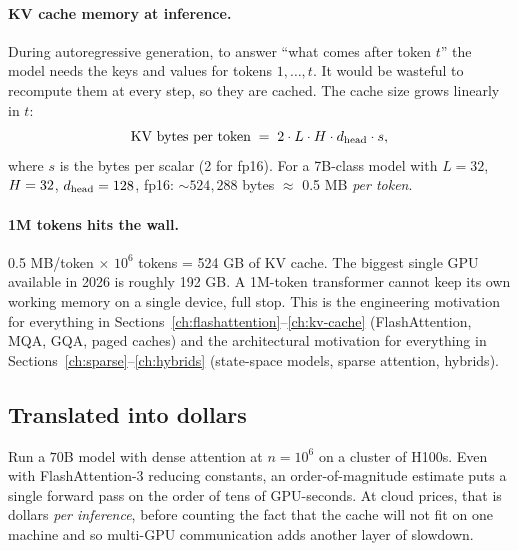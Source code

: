 \paragraph{KV cache memory at inference.} During autoregressive generation,
to answer ``what comes after token \(t\)'' the model needs the keys and
values for tokens \(1, \ldots, t\). It would be wasteful to recompute them at
every step, so they are cached. The cache size grows linearly in \(t\):
\begin{equation}
  \text{KV bytes per token} \;=\; 2 \cdot L \cdot H \cdot d_{\text{head}} \cdot s,
\end{equation}
where \(s\) is the bytes per scalar (2 for fp16). For a 7B-class model with
\(L=32\), \(H=32\), \(d_{\text{head}}=128\), fp16: ${\sim}524{,}288$ bytes
\(\approx\) 0.5 MB \emph{per token}.

\paragraph{1M tokens hits the wall.} 0.5 MB/token \(\times\) \(10^6\) tokens =
524 GB of KV cache. The biggest single GPU available in 2026 is roughly
192 GB. A 1M-token transformer cannot keep its own working memory on a single
device, full stop. This is the engineering motivation for everything in
Sections~\ref{ch:flashattention}--\ref{ch:kv-cache} (FlashAttention, MQA, GQA, paged caches) and the architectural
motivation for everything in Sections~\ref{ch:sparse}--\ref{ch:hybrids} (state-space models, sparse attention,
hybrids).

\subsection{Translated into dollars}

Run a \(70\)B model with dense attention at \(n = 10^6\) on a cluster of
H100s. Even with FlashAttention-3 reducing constants, an order-of-magnitude
estimate puts a single forward pass on the order of tens of GPU-seconds.
At cloud prices, that is dollars \emph{per inference}, before counting the
fact that the cache will not fit on one machine and so multi-GPU
communication adds another layer of slowdown.


